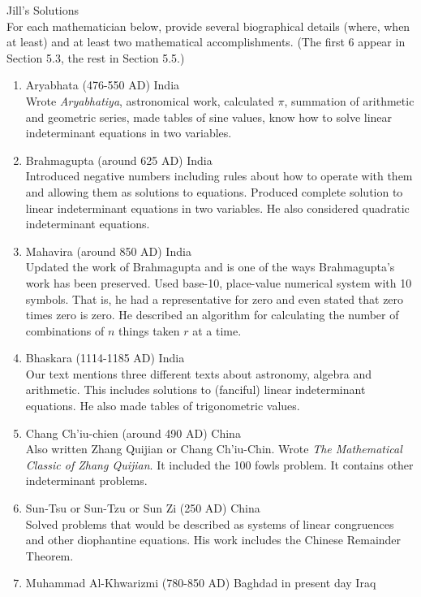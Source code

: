 \documentclass[12pt]{article}
\begin{document}
Jill's Solutions \\


 For each mathematician below, provide several biographical details (where, when at least) and at least two mathematical accomplishments. (The first 6 appear in Section 5.3, the rest in Section 5.5.)
 \begin{enumerate}
 \item Aryabhata (476-550 AD) India\\
 Wrote \textit{Aryabhatiya}, astronomical work, calculated $\pi$, summation of arithmetic and geometric series, made tables of sine values, know how to solve linear indeterminant equations in two variables.
 \vfill
 \item Brahmagupta (around 625 AD) India\\
 Introduced negative numbers including rules about how to operate with them and allowing them as solutions to equations. Produced complete solution to linear indeterminant equations in two variables. He also considered quadratic indeterminant equations.
 \vfill
 \item Mahavira (around 850 AD) India\\
Updated the work of Brahmagupta and is one of the ways Brahmagupta's work has been preserved. Used base-10, place-value numerical system with 10 symbols. That is, he had a representative for zero and even stated that zero times zero is zero. He described an algorithm for calculating the number of combinations of $n$ things taken $r$ at a time.
 \vfill
 \item Bhaskara (1114-1185 AD) India\\
 Our text mentions three different texts about astronomy, algebra and arithmetic. This includes solutions to (fanciful) linear indeterminant equations. He also made tables of trigonometric values.
 \vfill
 \item Chang Ch'iu-chien (around 490 AD) China\\
 Also written Zhang Quijian or Chang Ch'iu-Chin. Wrote \textit{The Mathematical Classic of Zhang Quijian}. It included the 100 fowls problem. It contains other indeterminant problems.
 \vfill
 \item Sun-Tsu or Sun-Tzu or Sun Zi (250 AD) China\\
 Solved problems that would be described as systems of linear congruences and other diophantine equations. His work includes the Chinese Remainder Theorem.
 \vfill
 \item Muhammad Al-Khwarizmi (780-850 AD) Baghdad in present day Iraq\\

\end{enumerate}
\end{document}
